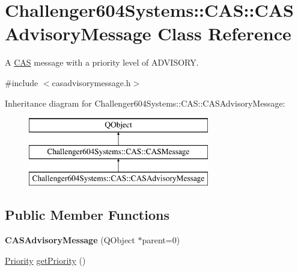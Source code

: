 \hypertarget{class_challenger604_systems_1_1_c_a_s_1_1_c_a_s_advisory_message}{\section{Challenger604\-Systems\-:\-:C\-A\-S\-:\-:C\-A\-S\-Advisory\-Message Class Reference}
\label{class_challenger604_systems_1_1_c_a_s_1_1_c_a_s_advisory_message}
}


A \hyperlink{namespace_challenger604_systems_1_1_c_a_s}{C\-A\-S} message with a priority level of A\-D\-V\-I\-S\-O\-R\-Y.  




{\ttfamily \#include $<$casadvisorymessage.\-h$>$}

Inheritance diagram for Challenger604\-Systems\-:\-:C\-A\-S\-:\-:C\-A\-S\-Advisory\-Message\-:\begin{figure}[H]
\begin{center}
\leavevmode
\includegraphics[height=3.000000cm]{class_challenger604_systems_1_1_c_a_s_1_1_c_a_s_advisory_message}
\end{center}
\end{figure}
\subsection*{Public Member Functions}
\begin{DoxyCompactItemize}
\item 
\hypertarget{class_challenger604_systems_1_1_c_a_s_1_1_c_a_s_advisory_message_a034cd5bca3a8964d79e1aaf30de18d6f}{{\bfseries C\-A\-S\-Advisory\-Message} (Q\-Object $\ast$parent=0)}\label{class_challenger604_systems_1_1_c_a_s_1_1_c_a_s_advisory_message_a034cd5bca3a8964d79e1aaf30de18d6f}

\item 
\hyperlink{class_challenger604_systems_1_1_c_a_s_1_1_c_a_s_message_a5a503c8cb9618403fcd342dca9ba1ca9}{Priority} \hyperlink{class_challenger604_systems_1_1_c_a_s_1_1_c_a_s_advisory_message_a01bef39f2d4301bfc7cebf0e9309b74c}{get\-Priority} ()
\end{DoxyCompactItemize}
